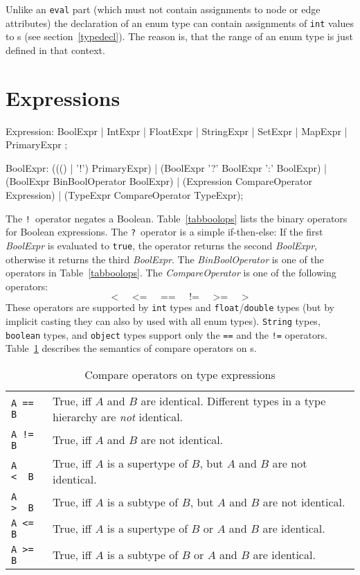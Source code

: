 \begin{note}
	Unlike an {\tt eval} part (which must not contain assignments to node or edge attributes) the declaration of an enum type can contain assignments of {\tt int} values to s (see section~\ref{typedecl}).
	The reason is, that the range of an enum type is just defined in that context.
\end{note}

\section{Expressions}
\label{expressions}
\begin{rail}
  Expression: BoolExpr | IntExpr | FloatExpr | StringExpr | SetExpr | MapExpr | PrimaryExpr ;  
\end{rail}
\begin{rail}
  BoolExpr: ((() | '!') PrimaryExpr) | (BoolExpr '?' BoolExpr ':' BoolExpr) | (BoolExpr BinBoolOperator BoolExpr) | (Expression CompareOperator Expression) | (TypeExpr CompareOperator TypeExpr);
\end{rail}
The \texttt{!}\ operator negates a Boolean. 
Table~\ref{tabboolops} lists the binary operators for Boolean expressions. 
The \texttt{?}\ operator is a simple if-then-else: If the first \emph{BoolExpr} is evaluated to \texttt{true}, the operator returns the second \emph{BoolExpr}, otherwise it returns the third \emph{BoolExpr}.
The \emph{BinBoolOperator} is one of the operators in Table~\ref{tabboolops}.
The \emph{CompareOperator} is one of the following operators:
\[ \texttt{<} \;\;\;\;\; \texttt{<=} \;\;\;\;\; \texttt{==} \;\;\;\;\; \texttt{!=} \;\;\;\;\; \texttt{>=} \;\;\;\;\; \texttt{>} \]
These operators are supported by \texttt{int} types and \texttt{float}/\texttt{double} types (but by implicit casting they can also by used with all enum types).
\texttt{String} types, \texttt{boolean} types, and \texttt{object} types support only the \texttt{==} and the \texttt{!=} operators.
Table~\ref{compandtypes} describes the semantics of compare operators on s.
\begin{table}[htbp]
  \centering
  \begin{tabularx}{\linewidth}{|l|X|} \hline
    \texttt{A == B} & True, iff $A$ and $B$ are identical. Different types in a type hierarchy are \emph{not} identical. \\
    \texttt{A != B} & True, iff $A$ and $B$ are not identical. \\
    \texttt{A <\ \ B} & True, iff $A$ is a supertype of $B$, but $A$ and $B$ are not identical. \\
    \texttt{A >\ \ B} & True, iff $A$ is a subtype of $B$, but $A$ and $B$ are not identical. \\
    \texttt{A <= B} & True, iff $A$ is a supertype of $B$ or $A$ and $B$ are identical. \\
    \texttt{A >= B} & True, iff $A$ is a subtype of $B$ or $A$ and $B$ are identical. \\ \hline
  \end{tabularx}
  \caption{Compare operators on type expressions}
  \label{compandtypes}
\end{table}
